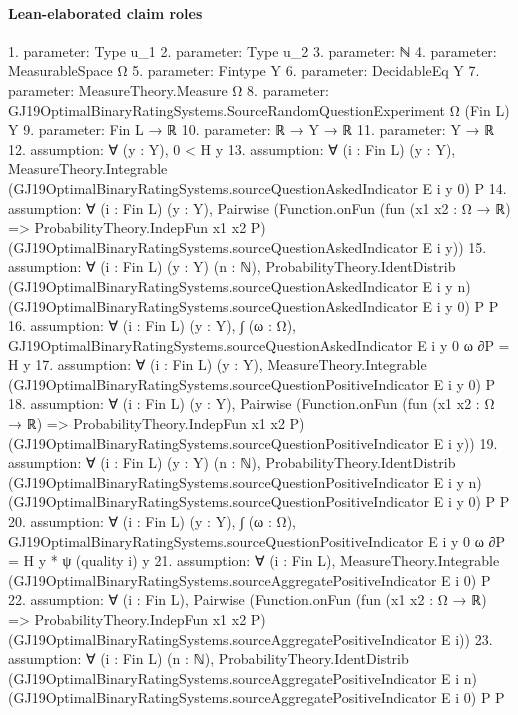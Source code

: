 \documentclass[10pt]{article}
\begin{document}
\paragraph{Lean-elaborated claim roles}\begin{ReviewVerbatim}
1. parameter: Type u_1
2. parameter: Type u_2
3. parameter: ℕ
4. parameter: MeasurableSpace Ω
5. parameter: Fintype Y
6. parameter: DecidableEq Y
7. parameter: MeasureTheory.Measure Ω
8. parameter: GJ19OptimalBinaryRatingSystems.SourceRandomQuestionExperiment Ω (Fin L) Y
9. parameter: Fin L → ℝ
10. parameter: ℝ → Y → ℝ
11. parameter: Y → ℝ
12. assumption: ∀ (y : Y), 0 < H y
13. assumption: ∀ (i : Fin L) (y : Y), MeasureTheory.Integrable (GJ19OptimalBinaryRatingSystems.sourceQuestionAskedIndicator E i y 0) P
14. assumption: ∀ (i : Fin L) (y : Y),
  Pairwise
    (Function.onFun (fun (x1 x2 : Ω → ℝ) => ProbabilityTheory.IndepFun x1 x2 P)
      (GJ19OptimalBinaryRatingSystems.sourceQuestionAskedIndicator E i y))
15. assumption: ∀ (i : Fin L) (y : Y) (n : ℕ),
  ProbabilityTheory.IdentDistrib (GJ19OptimalBinaryRatingSystems.sourceQuestionAskedIndicator E i y n)
    (GJ19OptimalBinaryRatingSystems.sourceQuestionAskedIndicator E i y 0) P P
16. assumption: ∀ (i : Fin L) (y : Y), ∫ (ω : Ω), GJ19OptimalBinaryRatingSystems.sourceQuestionAskedIndicator E i y 0 ω ∂P = H y
17. assumption: ∀ (i : Fin L) (y : Y),
  MeasureTheory.Integrable (GJ19OptimalBinaryRatingSystems.sourceQuestionPositiveIndicator E i y 0) P
18. assumption: ∀ (i : Fin L) (y : Y),
  Pairwise
    (Function.onFun (fun (x1 x2 : Ω → ℝ) => ProbabilityTheory.IndepFun x1 x2 P)
      (GJ19OptimalBinaryRatingSystems.sourceQuestionPositiveIndicator E i y))
19. assumption: ∀ (i : Fin L) (y : Y) (n : ℕ),
  ProbabilityTheory.IdentDistrib (GJ19OptimalBinaryRatingSystems.sourceQuestionPositiveIndicator E i y n)
    (GJ19OptimalBinaryRatingSystems.sourceQuestionPositiveIndicator E i y 0) P P
20. assumption: ∀ (i : Fin L) (y : Y),
  ∫ (ω : Ω), GJ19OptimalBinaryRatingSystems.sourceQuestionPositiveIndicator E i y 0 ω ∂P = H y * ψ (quality i) y
21. assumption: ∀ (i : Fin L), MeasureTheory.Integrable (GJ19OptimalBinaryRatingSystems.sourceAggregatePositiveIndicator E i 0) P
22. assumption: ∀ (i : Fin L),
  Pairwise
    (Function.onFun (fun (x1 x2 : Ω → ℝ) => ProbabilityTheory.IndepFun x1 x2 P)
      (GJ19OptimalBinaryRatingSystems.sourceAggregatePositiveIndicator E i))
23. assumption: ∀ (i : Fin L) (n : ℕ),
  ProbabilityTheory.IdentDistrib (GJ19OptimalBinaryRatingSystems.sourceAggregatePositiveIndicator E i n)
    (GJ19OptimalBinaryRatingSystems.sourceAggregatePositiveIndicator E i 0) P P

\end{ReviewVerbatim}
\end{document}
